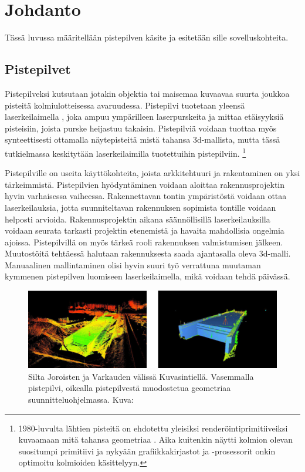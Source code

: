 \section{Johdanto}
Tässä luvussa määritellään pistepilven käsite ja esitetään sille sovelluskohteita.

\subsection{Pistepilvet}

Pistepilveksi kutsutaan jotakin objektia tai maisemaa kuvaavaa suurta joukkoa pisteitä kolmiulotteisessa avaruudessa. Pistepilvi tuotetaan yleensä laserkeilaimella , joka ampuu ympärilleen laserpurskeita ja mittaa etäisyyksiä pisteisiin, joista purske heijastuu takaisin. Pistepilviä voidaan tuottaa myös synteettisesti ottamalla näytepisteitä mistä tahansa 3d-mallista, mutta tässä tutkielmassa keskitytään laserkeilaimilla tuotettuihin pistepilviin. \footnote{1980-luvulta lähtien pisteitä on ehdotettu yleisiksi renderöintiprimitiiveiksi kuvaamaan mitä tahansa geometriaa \cite{Whitted}. Aika kuitenkin näytti kolmion olevan suositumpi primitiivi ja nykyään grafiikkakirjastot ja -prosessorit onkin optimoitu kolmioiden käsittelyyn.}

Pistepilville on useita käyttökohteita, joista arkkitehtuuri ja rakentaminen on yksi tärkeimmistä. Pistepilvien hyödyntäminen voidaan aloittaa rakennusprojektin hyvin varhaisessa vaiheessa. Rakennettavan tontin ympäristöstä voidaan ottaa laserkeilauksia, jotta suunniteltavan rakennuksen sopimista tontille voidaan helposti arvioida. Rakennusprojektin aikana säännöllisillä laserkeilauksilla voidaan seurata tarkasti projektin etenemistä ja havaita mahdollisia ongelmia ajoissa. Pistepilvillä on myös tärkeä rooli rakennuksen valmistumisen jälkeen. Muutostöitä tehtäessä halutaan rakennuksesta saada ajantasalla oleva 3d-malli. Manuaalinen mallintaminen olisi hyvin suuri työ verrattuna muutaman kymmenen pistepilven luomiseen laserkeilaimella, mikä voidaan tehdä päivässä. \cite{bim} 

\begin{figure}
    \centering
    \includegraphics[width=\textwidth]{img/silta.png}
    \caption{Silta Joroisten ja Varkauden välissä Kuvasintiellä. Vasemmalla pistepilvi, oikealla pistepilvestä muodostetua geometriaa suunnitteluohjelmassa. Kuva: \cite{silta}}
    \label{silt}
\end{figure}

